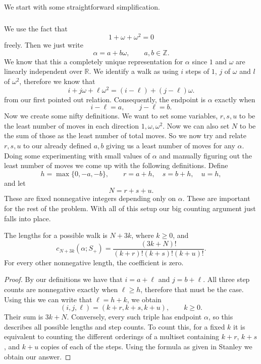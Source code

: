 \documentclass[11pt]{scrartcl}
\begin{document}
\begin{soln}
    We start with some straightforward simplification.
	\subsubsection*{}
	We use the fact that 	\[
	1+\omega+\omega^2=0
	\] freely.
 	Then we just write
	\[
	\alpha=a+b\omega,
	\qquad a,b\in\mathbb Z.
	\]
	We know that this a completely unique representation for $\alpha$ since $1$ and
	$\omega$ are linearly independent over $\mathbb R$.
	We identify a walk as using $i$ steps of $1$, $j$ of $\omega$ and $l$ of $\omega^2$, therefore we know that 
	\[
	i+j\omega+\ell\omega^2
	=(i-\ell)+(j-\ell)\omega.
	\]
	from our first pointed out relation.
	Consequently, the endpoint is $\alpha$ exactly when
	\[
	i-\ell=a,
	\qquad
	j-\ell=b.
	\]
	Now we create some nifty definitions. We want to set some variables, $r,s,u$ to 
    be the least number of moves in each direction $1,\omega, \omega^2$. 
    Now we can also set $N$ to be the sum of those as the least number of total moves. 
    So we now try and relate $r,s,u$ to our already defined $a,b$ giving us a least number of
    moves for any $\alpha$. Doing some experimenting with small values of $\alpha$ and manually figuring 
    out the least number of moves we come up with the following definitions. 
	Define
	\[
	h=\max\{0,-a,-b\},
	\qquad
	r=a+h,\quad s=b+h,\quad u=h,
	\]
	and let
	\[
	N=r+s+u.
	\]
	These are fixed nonnegative integers depending only on $\alpha$. 
    These are important for the rest of the problem.
	With all of this setup our big counting argument just falls into place.
	\begin{claim*}
		The lengths for a possible walk is $N+3k$, where $k\ge0$, and
		\[
		\boxed{
			c_{N+3k}(\alpha;S_+)
			=\frac{(3k+N)!}{(k+r)!(k+s)!(k+u)!}.
		}
		\tag{1}
		\]
		For every other nonnegative length, the coefficient is zero.
	\end{claim*}
	\newpage
	\begin{proof}
		By our definitions we have that $i=a+\ell$ and $j=b+\ell$. All three
		step counts are nonnegative exactly when $\ell\ge h$, therefore that must be the case. Using this we can write that
		$\ell=h+k$, we obtain
		\[
		(i,j,\ell)=(k+r,k+s,k+u),
		\qquad k\ge0.
		\]
		Their sum is $3k+N$. Conversely, every such triple has endpoint
		$\alpha$, so this describes all possible lengths and step counts.
		To count this, for a fixed $k$ it is equivalent to counting the different orderings of a multiset containing $k+r$, $k+s$, and $k+u$ copies of each of the steps. Using the formula as given in Stanley \cite[Section~1.2]{stanley-ec1} we obtain our answer.
			\end{proof}
	

\end{soln}
\end{document}
